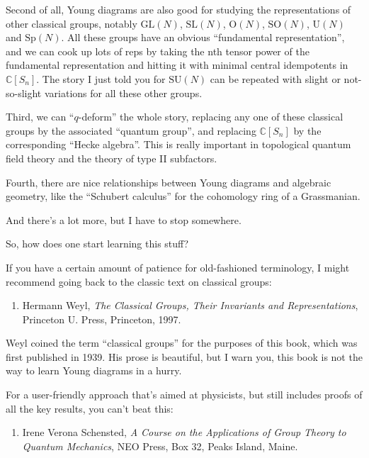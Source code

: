 \documentclass{article}
\def\tightlist{}
\begin{document}
Second of all, Young diagrams are also good for studying the
representations of other classical groups, notably \(\mathrm{GL}(N)\),
\(\mathrm{SL}(N)\), \(\mathrm{O}(N)\), \(\mathrm{SO}(N)\),
\(\mathrm{U}(N)\) and \(\mathrm{Sp}(N)\). All these groups have an
obvious ``fundamental representation'', and we can cook up lots of reps
by taking the nth tensor power of the fundamental representation and
hitting it with minimal central idempotents in \(\mathbb{C}[S_n]\). The
story I just told you for \(\mathrm{SU}(N)\) can be repeated with slight
or not-so-slight variations for all these other groups.

Third, we can ``\(q\)-deform'' the whole story, replacing any one of
these classical groups by the associated ``quantum group'', and
replacing \(\mathbb{C}[S_n]\) by the corresponding ``Hecke algebra''.
This is really important in topological quantum field theory and the
theory of type II subfactors.

Fourth, there are nice relationships between Young diagrams and
algebraic geometry, like the ``Schubert calculus'' for the cohomology
ring of a Grassmanian.

And there's a lot more, but I have to stop somewhere.

So, how does one start learning this stuff?

If you have a certain amount of patience for old-fashioned terminology,
I might recommend going back to the classic text on classical groups:

\begin{enumerate}
\def\labelenumi{\arabic{enumi})}
\tightlist
\item
  Hermann Weyl, \emph{The Classical Groups, Their Invariants and
  Representations}, Princeton U. Press, Princeton, 1997.
\end{enumerate}

Weyl coined the term ``classical groups'' for the purposes of this book,
which was first published in 1939. His prose is beautiful, but I warn
you, this book is not the way to learn Young diagrams in a hurry.

For a user-friendly approach that's aimed at physicists, but still
includes proofs of all the key results, you can't beat this:

\begin{enumerate}
\def\labelenumi{\arabic{enumi})}
\setcounter{enumi}{1}
\tightlist
\item
  Irene Verona Schensted, \emph{A Course on the Applications of Group
  Theory to Quantum Mechanics}, NEO Press, Box 32, Peaks Island, Maine.
\end{enumerate}
\end{document}
